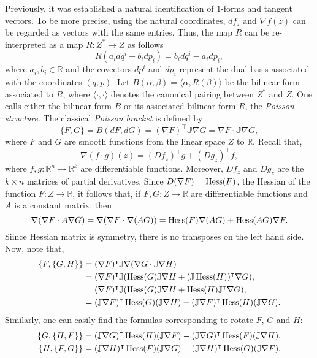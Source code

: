 Previously, it was established a natural identification of $1$-forms and tangent vectors. To be more precise, using the natural coordinates, $df_z$ and $\nabla f(z)$ can be regarded as vectors with the same entries. Thus, the map $R$ can be re-interpreted as a map $R: Z^\ast\to Z$ as follows
$$
R(a_idq^i+b_idp_i)=b_idq^i-a_idp_i,
$$
where $a_i, b_i\in \mathbb R$ and the covectors $dp^i$ and $dp_i$ represent the dual basis associated with the coordinates $(q,p)$. 
Let $B(\alpha, \beta)=\langle \alpha, R(\beta)\rangle$ be the bilinear form associated to $R$, where $\langle \cdot,\cdot \rangle$ denotes the canonical pairing between $Z^\ast$ and $Z$. One calls either the bilinear form $B$ or its associated bilinear form $R$, the \emph{Poisson structure}. The classical \emph{Poisson bracket} is defined by
$$
\{F, G\}=B(dF, dG)=(\nabla F)^\intercal \mathbb J\nabla G=\nabla F\cdot \mathbb J\nabla G,
$$
where $F$ and $G$ are smooth functions from the linear space $Z$ to $\mathbb R$. Recall that,
$$
\nabla (f\cdot g)(z)= (Df_z)^\intercal g+(Dg_z)^\intercal f,
$$
where $f,g:\mathbb R^n\to \mathbb R^k$ are differentiable functions. Moreover, $Df_z$ and $Dg_z$ are the $k\times n$ matrices of partial derivatives. Since $D(\nabla F)=\operatorname{Hess}(F)$, the Hessian of the function $F:Z\to \mathbb R$, it follows that, if $F, G:Z\to \mathbb R$ are differentiable functions and $A$ is a constant matrix, then
$$
\nabla (\nabla F\cdot A\nabla G)=\nabla (\nabla F\cdot \nabla (AG))=\operatorname{Hess}(F) \nabla(AG)+\operatorname{Hess}(AG)\nabla F.
$$
Siince Hessian matrix is symmetry, there is no transposes on the left hand side. Now, note that,
\begin{equation*}
\begin{split}
\{F, \{G, H\}\}&=(\nabla F)^\intercal \mathbb J\nabla (\nabla G\cdot  \mathbb J\nabla H)\\
&=(\nabla F)^\intercal \mathbb J(\operatorname{Hess}(G)\mathbb J\nabla H+(\mathbb J\operatorname{Hess}(H))^\intercal\nabla G),\\
&=(\nabla F)^\intercal \mathbb J(\operatorname{Hess}(G)\mathbb J\nabla H+\operatorname{Hess}(H)\mathbb J^\intercal\nabla G),\\
&=(\mathbb J\nabla F)^\intercal \operatorname{Hess}(G)(\mathbb J\nabla H)-(\mathbb J\nabla F)^\intercal \operatorname{Hess}(H)(\mathbb J\nabla G).
\end{split}
\end{equation*}
Similarly, one can easily find the formulas corresponding to rotate $F$, $G$ and $H$:
\begin{equation*}
\begin{split}
\{G, \{H, F\}\}&=(\mathbb J\nabla G)^\intercal \operatorname{Hess}(H)(\mathbb J\nabla F)-(\mathbb J\nabla G)^\intercal \operatorname{Hess}(F)(\mathbb J\nabla H),\\
\{H, \{F, G\}\}&=(\mathbb J\nabla H)^\intercal \operatorname{Hess}(F)(\mathbb J\nabla G)-(\mathbb J\nabla H)^\intercal \operatorname{Hess}(G)(\mathbb J\nabla F).
\end{split}
\end{equation*}
